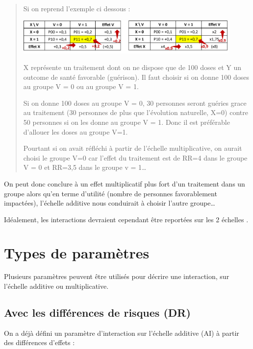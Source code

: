 \documentclass[
]{book}
\begin{document}
\begin{quote}
Si on reprend l'exemple ci dessous :

\includegraphics[width=0.9\textwidth,height=\textheight]{img/Image4.png}

X représente un traitement dont on ne dispose que de 100 doses et Y un outcome de santé favorable (guérison).
Il faut choisir si on donne 100 doses au groupe V = 0 ou au groupe V = 1.

Si on donne 100 doses au groupe V = 0, 30 personnes seront guéries grace au traitement (30 personnes de plus que l'évolution naturelle, X=0) contre 50 personnes si on les donne au groupe V = 1.
Donc il est préférable d'allouer les doses au groupe V=1.

Pourtant si on avait réfléchi à partir de l'échelle multiplicative, on aurait choisi le groupe V=0 car l'effet du traitement est de RR=4 dans le groupe V = 0 et RR=3,5 dans le groupe v = 1\ldots{}
\end{quote}

On peut donc conclure à un effet multiplicatif plus fort d'un traitement dans un groupe alors qu'en terme d'utilité (nombre de personnes favorablement impactées), l'échelle additive nous conduirait à choisir l'autre groupe\ldots{}

Idéalement, les interactions devraient cependant être reportées sur les 2 échelles \citet{knol_recommendations_2012} \citet{vanderweele_tutorial_2014}.

\hypertarget{param}{%
\chapter{Types de paramètres}\label{param}}

Plusieurs paramètres peuvent être utilisés pour décrire une interaction, sur l'échelle additive ou multiplicative.

\hypertarget{avec-les-diffuxe9rences-de-risques-dr}{%
\section{Avec les différences de risques (DR)}\label{avec-les-diffuxe9rences-de-risques-dr}}

On a déjà défini un paramètre d'interaction sur l'échelle additive (AI) à partir des différences d'effets \citet{vanderweele_tutorial_2014} :
\end{document}
